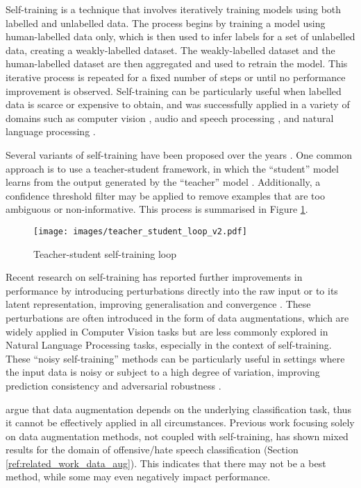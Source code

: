 \documentclass[11pt,a4paper]{article}
\begin{document}
Self-training is a technique that involves iteratively training models using both labelled and unlabelled data. The process begins by training a model using human-labelled data only, which is then used to infer labels for a set of unlabelled data, creating a weakly-labelled dataset. The weakly-labelled dataset and the human-labelled dataset are then aggregated and used to retrain the model. This iterative process is repeated for a fixed number of steps or until no performance improvement is observed. Self-training can be particularly useful when labelled data is scarce or expensive to obtain, and was successfully applied in a variety of domains such as computer vision \cite{10.1145/3577925}, audio and speech processing \cite{LIU2022100616}, and natural language processing \cite{selftrainingseq}. 

Several variants of self-training have been proposed over the years \citep{amini2022self}. One common approach is to use a teacher-student framework, in which the ``student'' model learns from the output generated by the ``teacher'' model \citep{cotraining, noisystudent, crosspseudosupervision, selftrainingweaksupervision}. Additionally, a confidence threshold filter may be applied to remove examples that are too ambiguous or non-informative. This process is summarised in Figure \ref{fig:self-training-loop}. 

\begin{figure}[!htb]
\centering
\texttt{[image: images/teacher\_student\_loop\_v2.pdf]}
\caption{Teacher-student self-training loop}
\label{fig:self-training-loop}
\end{figure}

Recent research on self-training has reported further improvements in performance by introducing perturbations directly into the raw input or to its latent representation, improving generalisation and convergence \cite{10.5555/2969442.2969635, temporal_ensembling, miyato2018virtual, selftrainingseq, xie2020unsupervised}. These perturbations are often introduced in the form of data augmentations, which are widely applied in Computer Vision tasks but are less commonly explored in Natural Language Processing tasks, especially in the context of self-training. These ``noisy self-training'' methods can be particularly useful in settings where the input data is noisy or subject to a high degree of variation, improving prediction consistency and adversarial robustness \citep{carmon2019, wallach2019, najafi2019}.

\citet{bayer2022survey} argue that data augmentation depends on the underlying classification task, thus it cannot be effectively applied in all circumstances. Previous work focusing solely on data augmentation methods, not coupled with self-training, has shown mixed results for the domain of offensive/hate speech classification (Section \ref{ref:related_work_data_aug}). This indicates that there may not be a best method, while some may even negatively impact performance.
\end{document}
